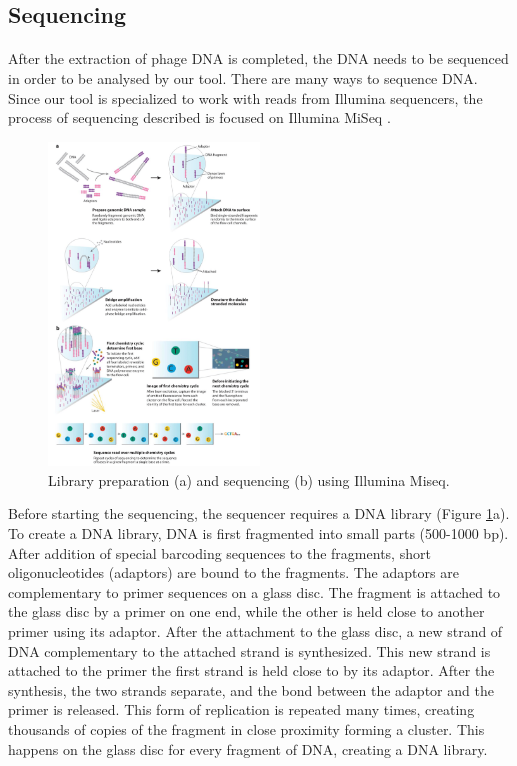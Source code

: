 \subsection{Sequencing}
\paragraph*{}
After the extraction of phage DNA is completed, the DNA needs to be sequenced in order to be analysed by our tool. There are many ways to sequence DNA. Since our tool is specialized to work with reads from Illumina sequencers, the process of sequencing described is focused on Illumina MiSeq \cite{ravi2018miseq}.

\begin{figure}[h]
  \begin{center}
     \includegraphics[width=0.5\textwidth]{images/sequencing.png}
     \caption{Library preparation (a) and sequencing (b) using Illumina Miseq\cite{phdthesis}.}\label{fig:sequencing}
  \end{center}
\end{figure} 

Before starting the sequencing, the sequencer requires a DNA library (Figure \ref{fig:sequencing}a). To create a DNA library, DNA is first fragmented into small parts (500-1000 bp). After addition of special barcoding sequences to the fragments, short oligonucleotides (adaptors) are bound to the fragments. The adaptors are complementary to primer sequences on a glass disc. The fragment is attached to the glass disc by a primer on one end, while the other is held close to another primer using its adaptor. After the attachment to the glass disc, a new strand of DNA complementary to the attached strand is synthesized. This new strand is attached to the primer the first strand is held close to by its adaptor. After the synthesis, the two strands separate, and the bond between the adaptor and the primer is released. This form of replication is repeated many times, creating thousands of copies of the fragment in close proximity forming a cluster. This happens on the glass disc for every fragment of DNA, creating a DNA library.

